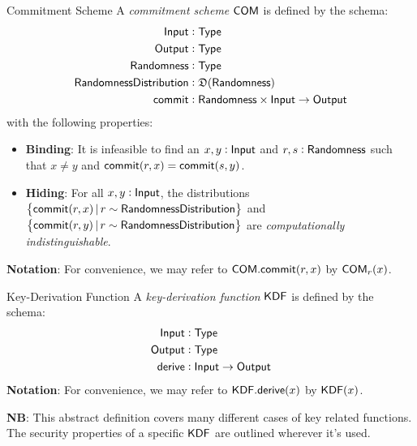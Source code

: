 \begin{definitiontoc}{Commitment Scheme}
    A \emph{commitment scheme} ${\textsf{COM}}$ is defined by the schema:
    \begin{align*}
        {\textsf{Input}}                  &: {\textsf{Type}} \\
        {\textsf{Output}}                 &: {\textsf{Type}} \\
        {\textsf{Randomness}}             &: {\textsf{Type}} \\
        {\textsf{RandomnessDistribution}} &: \mathfrak{D}({\textsf{Randomness}}) \\
        {\textsf{commit}}                 &: {\textsf{Randomness}} \times {\textsf{Input}} \to {\textsf{Output}}
    \end{align*}
    with the following properties:
    \begin{itemize}
        \item \textbf{Binding}: It is infeasible to find an $x, y : {\textsf{Input}}$ and $r, s: {\textsf{Randomness}}$ such that $x \ne y$ and ${\textsf{commit}}(r,x) = {\textsf{commit}}(s,y)$.
        \item \textbf{Hiding}: For all $x, y : {\textsf{Input}}$, the distributions $\set{{\textsf{commit}}(r,x) \,|\, r \sim {\textsf{RandomnessDistribution}}}$ and \\ $\set{{\textsf{commit}}(r,y) \,|\, r \sim {\textsf{RandomnessDistribution}}}$ are \emph{computationally indistinguishable}.
    \end{itemize}

    \textbf{Notation}: For convenience, we may refer to ${\textsf{COM}}.{\textsf{commit}}(r,x)$ by ${\textsf{COM}}_r(x)$.
\end{definitiontoc}

\begin{definitiontoc}{Key-Derivation Function}
    A \emph{key-derivation function} ${\textsf{KDF}}$ is defined by the schema:
    \begin{align*}
        {\textsf{Input}}  &: {\textsf{Type}} \\
        {\textsf{Output}} &: {\textsf{Type}} \\
        {\textsf{derive}} &: {\textsf{Input}} \to {\textsf{Output}}
    \end{align*}
    \textbf{Notation}: For convenience, we may refer to ${\textsf{KDF}}.{\textsf{derive}}(x)$ by ${\textsf{KDF}}(x)$.

    \textbf{NB}: This abstract definition covers many different cases of key related functions. The security properties of a specific ${\textsf{KDF}}$ are outlined wherever it's used.
\end{definitiontoc}


